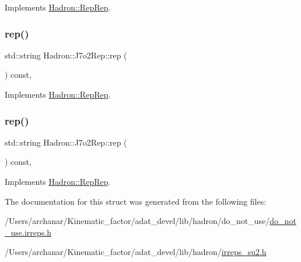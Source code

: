 Implements \mbox{\hyperlink{structHadron_1_1RepRep_ab3213025f6de249f7095892109575fde}{Hadron\+::\+Rep\+Rep}}.

\mbox{\label{structHadron_1_1J7o2Rep_a7fe87890d8fa36768f1a09f929f26b9c}} 
\subsubsection{\texorpdfstring{rep()}{rep()}\hspace{0.1cm}{\footnotesize\ttfamily [2/3]}}
{\footnotesize\ttfamily std\+::string Hadron\+::\+J7o2\+Rep\+::rep (\begin{DoxyParamCaption}{ }\end{DoxyParamCaption}) const\hspace{0.3cm}{\ttfamily [inline]}, {\ttfamily [virtual]}}



Implements \mbox{\hyperlink{structHadron_1_1RepRep_ab3213025f6de249f7095892109575fde}{Hadron\+::\+Rep\+Rep}}.

\mbox{\label{structHadron_1_1J7o2Rep_a7fe87890d8fa36768f1a09f929f26b9c}} 
\subsubsection{\texorpdfstring{rep()}{rep()}\hspace{0.1cm}{\footnotesize\ttfamily [3/3]}}
{\footnotesize\ttfamily std\+::string Hadron\+::\+J7o2\+Rep\+::rep (\begin{DoxyParamCaption}{ }\end{DoxyParamCaption}) const\hspace{0.3cm}{\ttfamily [inline]}, {\ttfamily [virtual]}}



Implements \mbox{\hyperlink{structHadron_1_1RepRep_ab3213025f6de249f7095892109575fde}{Hadron\+::\+Rep\+Rep}}.



The documentation for this struct was generated from the following files\+:\begin{DoxyCompactItemize}
\item 
/\+Users/archanar/\+Kinematic\+\_\+factor/adat\+\_\+devel/lib/hadron/do\+\_\+not\+\_\+use/\mbox{\hyperlink{do__not__use_8irreps_8h}{do\+\_\+not\+\_\+use.\+irreps.\+h}}\item 
/\+Users/archanar/\+Kinematic\+\_\+factor/adat\+\_\+devel/lib/hadron/\mbox{\hyperlink{lib_2hadron_2irreps__su2_8h}{irreps\+\_\+su2.\+h}}\end{DoxyCompactItemize}
